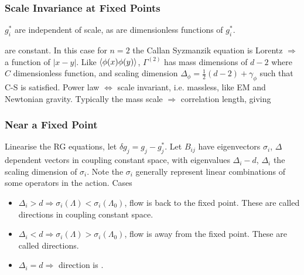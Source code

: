 \documentclass{article}
\begin{document}
\subsubsection*{Scale Invariance at Fixed Points}
$g_i^\ast$ are independent of scale, as are dimensionless functions of $g_i^\ast$. 

\begin{example}
are constant. In this case for $n=2$ the Callan Syzmanzik equation is 
Lorentz $\Rightarrow $ a function of $|x-y|$. Like $\braket{\phi(x)\phi(y)}$, $\Gamma^{(2)}$ has mass dimensions of $d-2$ 
where $C$ dimensionless function, and scaling dimension $\Delta_\phi = \frac{1}{2}(d-2) + \gamma_\phi$ such that C-S is satisfied. 
Power law $\Leftrightarrow $ scale invariant, i.e. massless, like EM and Newtonian gravity. Typically the mass scale $\Rightarrow $ correlation length, giving 
\end{example}


\subsubsection*{Near a Fixed Point}
Linearise the RG equations, let $\delta g_j = g_j - g_j^\ast$. 
Let $B_{ij}$ have eigenvectors $\sigma_i$, $\Delta$ dependent vectors in coupling constant space, with eigenvalues $\Delta_i - d$, $\Delta_i$ the scaling dimension of $\sigma_i$. Note the $\sigma_i$ generally represent linear combinations of some operators in  the action. 
Cases
\begin{itemize}
    \item $\Delta_i > d \Rightarrow \sigma_i(\Lambda) < \sigma_i(\Lambda_0)$, flow is back to the fixed point. These are called  directions in coupling constant space. 
    \item $\Delta_i < d \Rightarrow \sigma_i(\Lambda) > \sigma_i(\Lambda_0)$, flow is away from the fixed point. These are called  directions. 
    \item  $\Delta_i = d \Rightarrow $ direction is .
\end{itemize}
\end{document}
